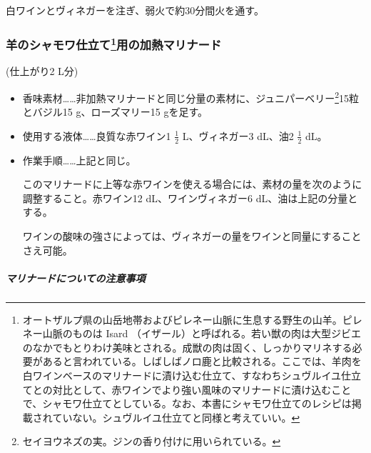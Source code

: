 \begin{recette}
\begin{itemize}
  白ワインとヴィネガーを注ぎ、弱火で約30分間火を通す。
\end{itemize}

\hypertarget{marinade-cuite-pour-le-mouton-en-chamois}{%
\subsubsection[羊のシャモワ仕立て用の加熱マリナード]{\texorpdfstring{羊のシャモワ仕立て\footnote{オートザルプ県の山岳地帯およびピレネー山脈に生息する野生の山羊。ピレネー山脈のものは
  Isard
  （イザール）と呼ばれる。若い獣の肉は大型ジビエのなかでもとりわけ美味とされる。成獣の肉は固く、しっかりマリネする必要があると言われている。しばしばノロ鹿と比較される。ここでは、羊肉を白ワインベースのマリナードに漬け込む仕立て、すなわちシュヴルイユ仕立てとの対比として、赤ワインでより強い風味のマリナードに漬け込むことで、シャモワ仕立てとしている。なお、本書にシャモワ仕立てのレシピは掲載されていない。シュヴルイユ仕立てと同様と考えていい。}用の加熱マリナード}{羊のシャモワ仕立て用の加熱マリナード}}\label{marinade-cuite-pour-le-mouton-en-chamois}}



(仕上がり2 L分)

\begin{itemize}
\item
  香味素材\ldots{}\ldots{}非加熱マリナードと同じ分量の素材に、ジュニパーベリー\footnote{セイヨウネズの実。ジンの香り付けに用いられている。}15粒とバジル15
  g、ローズマリー15 gを足す。
\item
  使用する液体\ldots{}\ldots{}良質な赤ワイン1 \(\frac{1}{2}\)
  L、ヴィネガー3 dL、油2 \(\frac{1}{2}\) dL。
\item
  作業手順\ldots{}\ldots{}上記と同じ。

  このマリナードに上等な赤ワインを使える場合には、素材の量を次のように調整すること。赤ワイン12
  dL、ワインヴィネガー6 dL、油は上記の分量とする。

  ワインの酸味の強さによっては、ヴィネガーの量をワインと同量にすることさえ可能。
\end{itemize}

\hypertarget{observation-sur-les-marinades}{%
\subparagraph{マリナードについての注意事項}\label{observation-sur-les-marinades}}


\end{recette}
